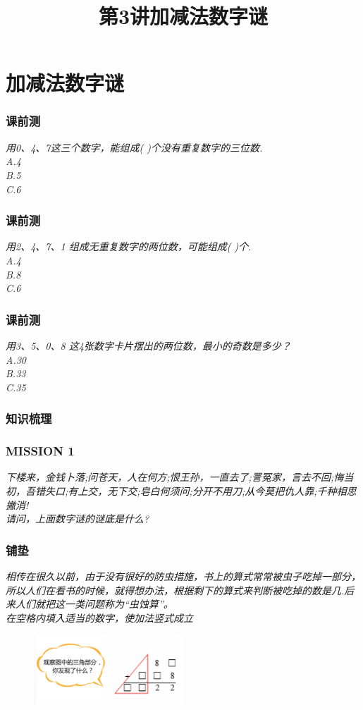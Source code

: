\section{加减法数字谜}

\title[第3讲\quad 加减法数字谜]{第3讲\quad 加减法数字谜} 
\author{}
\date{}
\begin{frame}
    \titlepage
\end{frame}

\begin{frame}
    \frametitle{课前测}
    \textit{用0、4、7这三个数字，能组成( )个没有重复数字的三位数.\\
    A.4\\ 
    B.5\\ 
    C.6}
\end{frame}

\begin{frame}
    \frametitle{课前测}
    \textit{用2、4、7、1 组成无重复数字的两位数，可能组成( )个.\\
    A.4\\ 
    B.8\\ 
    C.6}
\end{frame}

\begin{frame}
    \frametitle{课前测}
    \textit{用3、5、0、8 这4张数字卡片摆出的两位数，最小的奇数是多少？\\
    A.30\\ 
    B.33\\ 
    C.35}
\end{frame}

\begin{frame}
    \frametitle{知识梳理}
\end{frame}

\begin{frame}
    \frametitle{MISSION 1}
    \textit{下楼来，金钱卜落;问苍天，人在何方;恨王孙，一直去了;詈冤家，言去不回;悔当初，吾错失口;有上交，无下交;皂白何须问;分开不用刀;从今莫把仇人靠;千种相思撇消!\\
    请问，上面数字谜的谜底是什么?}
\end{frame}

\begin{frame}
    \frametitle{铺垫}
    \textit{相传在很久以前，由于没有很好的防虫措施，书上的算式常常被虫子吃掉一部分，所以人们在看书的时候，就得想办法，根据剩下的算式来判断被吃掉的数是几.后来人们就把这一类问题称为“虫蚀算”。\\
    在空格内填入适当的数字，使加法竖式成立}
    \begin{figure}[H] 
        \centering
        \includegraphics[width=0.5\textwidth]{./pics/Chapter_3/pudian.png}
    \end{figure}
\end{frame}

